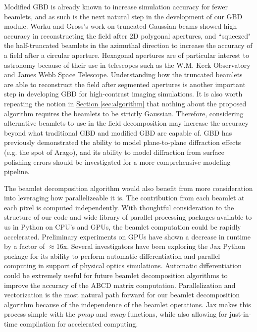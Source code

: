 Modified GBD is already known to increase simulation accuracy for fewer beamlets\cite{Worku19}, and as such is the next natural step in the development of our GBD module. Worku and Gross's work on truncated Gaussian beams showed high accuracy in reconstructing the field after 2D polygonal apertures, and ``squeezed" the half-truncated beamlets in the azimuthal direction to increase the accuracy of a field after a circular aperture. Hexagonal apertures are of particular interest to astronomy because of their use in telescopes such as the W.M. Keck Observatory and James Webb Space Telescope. Understanding how the truncated beamlets are able to reconstruct the field after segmented apertures is another important step in developing GBD for high-contrast imaging simulations. It is also worth repeating the notion in \hyperref[sec:algorithm]{Section \ref{sec:algorithm}} that nothing about the proposed algorithm requires the beamlets to be strictly Gaussian. Therefore, considering alternative beamlets to use in the field decomposition may increase the accuracy beyond what traditional GBD and modified GBD are capable of. GBD has previously demonstrated the ability to model plane-to-plane diffraction effects (e.g. the spot of Arago)\cite{Harvey15}, and its ability to model diffraction from surface polishing errors should be investigated for a more comprehensive modeling pipeline.

The beamlet decomposition algorithm would also benefit from more consideration into leveraging how parallelizeable it is. The contribution from each beamlet at each pixel is computed independently. With thoughtful consideration to the structure of our code and wide library of parallel processing packages available to us in Python on CPU's and GPUs\cite{lam_numba_2015,robert_mcleod_2018_2483274}, the beamlet computation could be rapidly accelerated. Preliminary experiments on GPUs have shown a decrease in runtime by a factor of $\approx$16x. Several investigators have been exploring the Jax Python package for its ability to perform automatic differentiation and parallel computing in support of physical optics simulations\cite{Desdoigts2022,Wong21,Pope21}. Automatic differentiation could be extremely useful for future beamlet decomposition algorithms to improve the accuracy of the ABCD matrix computation. Parallelization and vectorization is the most natural path forward for our beamlet decomposition algorithm because of the independence of the beamlet operations. Jax makes this process simple with the \emph{pmap} and \emph{vmap} functions, while also allowing for just-in-time compilation for accelerated computing. 

